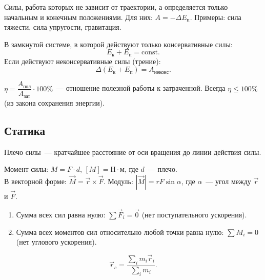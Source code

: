 \documentclass[12pt]{article}
\begin{document}
\begin{definition}
	Силы, работа которых не зависит от траектории, а определяется только начальным и конечным положениями. Для них: $A = -\Delta E_{\text{п}}$. Примеры: сила тяжести, сила упругости, гравитация.
\end{definition}

\begin{law}
	В замкнутой системе, в которой действуют только консервативные силы:
	\[
		E_{\text{к}} + E_{\text{п}} = \mathrm{const}.
	\]
	Если действуют неконсервативные силы (трение):
	\[
		\Delta(E_{\text{к}} + E_{\text{п}}) = A_{\text{неконс}}.
	\]
\end{law}

\begin{definition}[КПД]
	$\eta = \dfrac{A_{\text{пол}}}{A_{\text{зат}}} \cdot 100\%$~--- отношение полезной работы к затраченной. Всегда $\eta \leqslant 100\%$ (из закона сохранения энергии).
\end{definition}

\subsection{Статика}

\begin{definition}
	Плечо силы~--- кратчайшее расстояние от оси вращения до линии действия силы.
\end{definition}

\begin{definition}
	Момент силы: $M = F \cdot d$, $[M] = \text{Н}\cdot\text{м}$, где $d$~--- плечо.\\
	В векторной форме: $\vec{M} = \vec{r} \times \vec{F}$. Модуль: $|\vec{M}| = rF\sin\alpha$, где $\alpha$~--- угол между $\vec{r}$ и $\vec{F}$.
\end{definition}

\begin{definition}
	\begin{enumerate}
		\item Сумма всех сил равна нулю: $\sum \vec{F}_i = \vec{0}$ (нет поступательного ускорения).
		\item Сумма всех моментов сил относительно любой точки равна нулю: $\sum M_i = 0$ (нет углового ускорения).
	\end{enumerate}
\end{definition}

\begin{definition}
	\[
		\vec{r}_c = \frac{\sum_i m_i \vec{r}_i}{\sum_i m_i}.
	\]
\end{definition}
\end{document}
